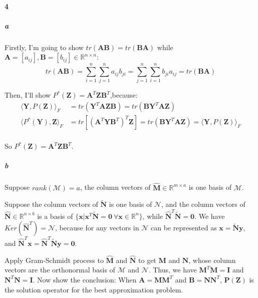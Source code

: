 \documentclass[22pt]{article}
\begin{document}
	\paragraph{4}
		\subparagraph{a} 

		Firstly, I'm going to show $tr(\mathbf{AB}) = tr(\mathbf{BA})$ while $\mathbf{A}=[a_{ij}], \mathbf{B} = [b_{ij}] \in \mathbb{R}^{n\times n}$:
		\begin{equation}
			tr(\mathbf{AB}) = \sum\limits_{i=1}^{n}\sum\limits_{j=1}^{n} a_{ij}b_{ji} = \sum\limits_{j=1}^{n}\sum\limits_{i=1}^{n} b_{ji}a_{ij} = tr(\mathbf{BA}) 
		\end{equation}

		Then, I'll show $P^*(\mathbf{Z}) = \mathbf{A}^T\mathbf{Z}\mathbf{B}^T$,because:
		\begin{align}
			\langle \mathbf{Y},P(\mathbf{Z}) \rangle_F & = tr(\mathbf{Y}^T\mathbf{AZB}) = tr(\mathbf{BY}^T\mathbf{AZ})\\
			\langle P^*(\mathbf{Y}),\mathbf{Z} \rangle_F & = tr[(\mathbf{A}^T\mathbf{Y}\mathbf{B}^T)^T\mathbf{Z}] = tr(\mathbf{BY}^T\mathbf{AZ})=\langle \mathbf{Y},P(\mathbf{Z}) \rangle_F\\
		\end{align}

		So $P^*(\mathbf{Z}) = \mathbf{A}^T\mathbf{Z}\mathbf{B}^T$.

		\subparagraph{b} Suppose $rank(\mathcal{M}) = a$, the column vectors of $\hat{\mathbf{M}} \in \mathbb{R}^{m\times a}$ is one basis of $\mathcal{M}$.

		Suppose the column vectors of $\tilde{\mathbf{N}}$  is one basis of $\mathcal{N}$, and the column vectors of $\hat{\mathbf{N}} \in \mathbb{R}^{n\times b}$ is a basis of $\{\mathbf{x}|\mathbf{x}^T\tilde{\mathbf{N}} = \mathbf{0}\ \forall \mathbf{x}\in \mathbb{R}^{n}\}$, while $\hat{\mathbf{N}}^T \tilde{\mathbf{N}} = \mathbf{0}$. We have $Ker(\hat{\mathbf{N}}^T) = \mathcal{N}$, because for any vectors in $\mathcal{N}$ can be represented as $\mathbf{x} = \tilde{\mathbf{N}}\mathbf{y}$, and $\hat{\mathbf{N}}^T\mathbf{x} = \hat{\mathbf{N}}^T \tilde{\mathbf{N}}\mathbf{y} = \mathbf{0}$.

		Apply Gram-Schmidt process to $\hat{\mathbf{M}}$ and $\hat{\mathbf{N}}$ to get $\mathbf{M}$ and $\mathbf{N}$, whose column vectors are the orthonormal basis of $\mathcal{M}$ and $\mathcal{N}$. Thus, we have $\mathbf{M}^T\mathbf{M} = \mathbf{I}$ and $\mathbf{N}^T\mathbf{N} = \mathbf{I}$. Now show the conclusion: When $\mathbf{A = MM}^T$ and $\mathbf{B=NN}^T$, $\mathbf{P(Z)}$ is the solution operator for the best approximation problem.
\end{document}
